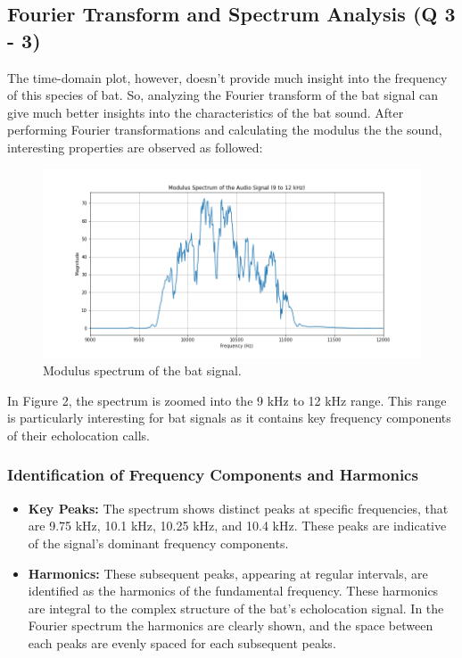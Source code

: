 \documentclass[12pt]{article}
\begin{document}
\subsection{Fourier Transform and Spectrum Analysis (Q 3 - 3)}
The time-domain plot, however, doesn't provide much insight into the frequency of this species of bat. So, analyzing the Fourier transform of the bat signal can give much better insights into the characteristics of the bat sound. After performing Fourier transformations and calculating the modulus the the sound, interesting properties are observed as followed:

\begin{figure}[h]
\centering
\includegraphics[width=1\textwidth]{modulus_spectrum.png}
\caption{Modulus spectrum of the bat signal.}
\end{figure}

In Figure 2, the spectrum is zoomed into the 9 kHz to 12 kHz range. This range is particularly interesting for bat signals as it contains key frequency components of their echolocation calls.

\subsubsection*{Identification of Frequency Components and Harmonics}
\begin{itemize}
    \item \textbf{Key Peaks:} The spectrum shows distinct peaks at specific frequencies, that are 9.75 kHz, 10.1 kHz, 10.25 kHz, and 10.4 kHz. These peaks are indicative of the signal's dominant frequency components.
        
    \item \textbf{Harmonics:} These subsequent peaks, appearing at regular intervals, are identified as the harmonics of the fundamental frequency. These harmonics are integral to the complex structure of the bat's echolocation signal. In the Fourier spectrum the harmonics are clearly shown, and the space between each peaks are evenly spaced for each subsequent peaks.
\end{itemize}
\end{document}
